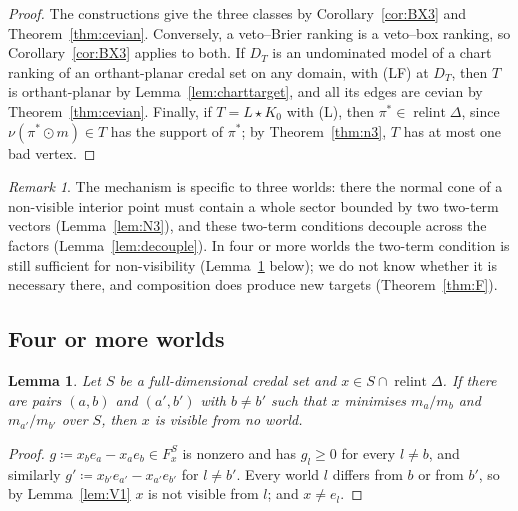 \documentclass[11pt]{article}
\DeclareMathOperator{\relint}{relint}
\theoremstyle{plain}
\newtheorem{lemma}[theorem]{Lemma}
\theoremstyle{definition}
\theoremstyle{remark}
\newtheorem{remark}[theorem]{Remark}
\begin{document}
\begin{proof}
The constructions give the three classes by Corollary~\ref{cor:BX3} and
Theorem~\ref{thm:cevian}. Conversely, a veto--Brier ranking is a veto--box ranking, so
Corollary~\ref{cor:BX3} applies to both. If $D_T$ is an undominated model of a chart
ranking of an orthant-planar credal set on any domain, with (LF) at $D_T$, then $T$ is
orthant-planar by Lemma~\ref{lem:charttarget}, and all its edges are cevian by
Theorem~\ref{thm:cevian}. Finally, if $T=L\star K_0$ with (L),
then $\pi^\ast\in\relint\Delta$, since $\nu(\pi^\ast\odot m)\in T$ has the support of
$\pi^\ast$; by Theorem~\ref{thm:n3}, $T$ has at most one bad vertex.
\end{proof}

\begin{remark}\label{rem:n3}
The mechanism is specific to three worlds: there the normal cone of a non-visible interior
point must contain a whole sector bounded by two two-term vectors (Lemma~\ref{lem:N3}), and
these two-term conditions decouple across the factors (Lemma~\ref{lem:decouple}). In four
or more worlds the two-term condition is still sufficient for non-visibility
(Lemma~\ref{lem:twopair} below); we do not know whether it is necessary there, and
composition does produce new targets (Theorem~\ref{thm:F}).
\end{remark}

\subsection{Four or more worlds}

\begin{lemma}\label{lem:twopair}
Let $S$ be a full-dimensional credal set and $x\in S\cap\relint\Delta$. If there are pairs
$(a,b)$ and $(a',b')$ with $b\ne b'$ such that $x$ minimises $m_a/m_b$ and $m_{a'}/m_{b'}$
over $S$, then $x$ is visible from no world.
\end{lemma}

\begin{proof}
$g\coloneqq x_be_a-x_ae_b\in F^S_x$ is nonzero and has $g_l\ge0$ for every $l\ne b$, and
similarly $g'\coloneqq x_{b'}e_{a'}-x_{a'}e_{b'}$ for $l\ne b'$. Every world $l$ differs
from $b$ or from $b'$, so by Lemma~\ref{lem:V1} $x$ is not visible from $l$; and
$x\ne e_l$.
\end{proof}
\end{document}
